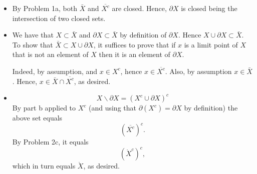 \documentclass[12pt]{article}
\newcommand\bi{\begin{itemize}}
\newcommand\ei{\end{itemize}}
\newcommand\itema{\item[(a)]}
\newcommand\itemb{\item[(b)]}
\newcommand\itemc{\item[(c)]}
\renewcommand\|{\ | \ }
\begin{document}
\bi
\itema

By Problem 1a, both $\bar X$ and $\overline{X^c}$ are closed. Hence,
$\partial X$ is closed being the intersection of two closed sets.
\itemb
We have that $X \subset \bar X$ and $\partial X \subset \bar X$
by definition of $\partial X$. Hence $X \cup \partial X \subset \bar X$.
To show that $\bar X \subset X \cup \partial X$, it suffices to prove that
if $x$ is a limit point of $X$ that is not an element of $X$ then 
it is an element of $\partial X$. 

Indeed, by assumption,  and $x \in X^c$, hence $x \in \overline{X^c}$.
Also, by assumption $x \in \bar X$. Hence, 
$x\in \bar X \cap \overline{X^c}$, as desired.
\itemc
\[
X \backslash \partial X = (X^c \cup \partial X)^c 
\]
By part b applied to $X^c$ (and using that $\partial(X^c) = \partial X$ by
definition) the above set equals
\[
(\overline{X^c})^c.
\]
By Problem 2c, it equals
\[
(\mathring X^c)^c,
\]
which in turn equals $\mathring X$, as desired.

\ei
\end{document}
